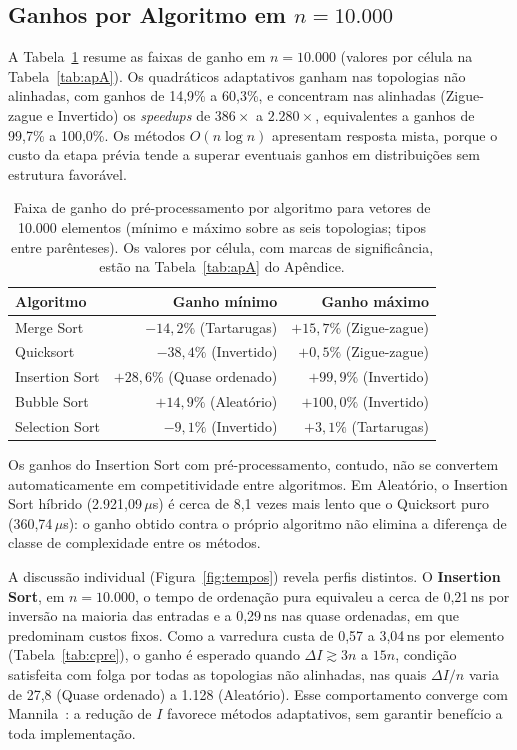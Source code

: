 \documentclass[12pt]{article}
\begin{document}
\subsection{Ganhos por Algoritmo em $n=10.000$}\label{sec:ganho}

A Tabela~\ref{tab:tempos} resume as faixas de ganho em $n=10.000$ (valores por célula na Tabela~\ref{tab:apA}). Os quadráticos adaptativos ganham nas topologias não alinhadas, com ganhos de 14,9\% a 60,3\%, e concentram nas alinhadas (Zigue-zague e Invertido) os \emph{speedups} de $386\times$ a $2.280\times$, equivalentes a ganhos de 99,7\% a 100,0\%. Os métodos $O(n \log n)$ apresentam resposta mista, porque o custo da etapa prévia tende a superar eventuais ganhos em distribuições sem estrutura favorável.

\begin{table}[htbp]
\centering
\caption{Faixa de ganho do pré-processamento por algoritmo para vetores de 10.000 elementos (mínimo e máximo sobre as seis topologias; tipos entre parênteses). Os valores por célula, com marcas de significância, estão na Tabela~\ref{tab:apA} do Apêndice.}
\label{tab:tempos}
\small
\begin{tabular}{lrr}
\hline
\textbf{Algoritmo} & \textbf{Ganho mínimo} & \textbf{Ganho máximo} \\
\hline
Merge Sort & $-14,2\%$ (Tartarugas) & $+15,7\%$ (Zigue-zague) \\
Quicksort & $-38,4\%$ (Invertido) & $+0,5\%$ (Zigue-zague) \\
Insertion Sort & $+28,6\%$ (Quase ordenado) & $+99,9\%$ (Invertido) \\
Bubble Sort & $+14,9\%$ (Aleatório) & $+100,0\%$ (Invertido) \\
Selection Sort & $-9,1\%$ (Invertido) & $+3,1\%$ (Tartarugas) \\
\hline
\end{tabular}
\end{table}

Os ganhos do Insertion Sort com pré-processamento, contudo, não se convertem automaticamente em competitividade entre algoritmos. Em Aleatório, o Insertion Sort híbrido (2.921,09\,$\mu$s) é cerca de 8,1 vezes mais lento que o Quicksort puro (360,74\,$\mu$s): o ganho obtido contra o próprio algoritmo não elimina a diferença de classe de complexidade entre os métodos.

A discussão individual (Figura~\ref{fig:tempos}) revela perfis distintos. O \textbf{Insertion Sort}, em $n=10.000$, o tempo de ordenação pura equivaleu a cerca de 0,21\,ns por inversão na maioria das entradas e a 0,29\,ns nas quase ordenadas, em que predominam custos fixos. Como a varredura custa de 0,57 a 3,04\,ns por elemento (Tabela~\ref{tab:cpre}), o ganho é esperado quando $\Delta I \gtrsim 3n$ a $15n$, condição satisfeita com folga por todas as topologias não alinhadas, nas quais $\Delta I/n$ varia de 27,8 (Quase ordenado) a 1.128 (Aleatório). Esse comportamento converge com Mannila~\cite{mannila_measures_1984}: a redução de $I$ favorece métodos adaptativos, sem garantir benefício a toda implementação.
\end{document}
